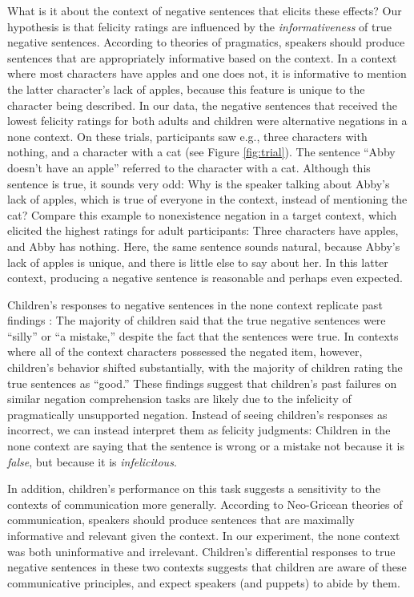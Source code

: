 \documentclass[man, noapacite]{apa2}
\begin{document}
What is it about the context of negative sentences that elicits these effects? Our hypothesis is that felicity ratings are influenced by the \emph{informativeness} of true negative sentences. According to theories of pragmatics, speakers should produce sentences that are appropriately informative based on the context. In a context where most characters have apples and one does not, it is informative to mention the latter character's lack of apples, because this feature is unique to the character being described. In our data, the negative sentences that received the lowest felicity ratings for both adults and children were alternative negations in a none context. On these trials, participants saw e.g., three characters with nothing, and a character with a cat (see Figure \ref{fig:trial}). The sentence ``Abby doesn't have an apple'' referred to the character with a cat. Although this sentence is true, it sounds very odd: Why is the speaker talking about Abby's lack of apples, which is true of everyone in the context, instead of mentioning the cat? Compare this example to nonexistence negation in a target context, which elicited the highest ratings for adult participants: Three characters have apples, and Abby has nothing. Here, the same sentence sounds natural, because Abby's lack of apples is unique, and there is little else to say about her. In this latter context, producing a negative sentence is reasonable and perhaps even expected.

Children's responses to negative sentences in the none context replicate past findings \cite{kim1985}: The majority of children said that the true negative sentences were ``silly'' or ``a mistake,'' despite the fact that the sentences were true. In contexts where all of the context characters possessed the negated item, however, children's behavior shifted substantially, with the majority of children rating the true sentences as ``good.'' These findings suggest that children's past failures on similar negation comprehension tasks are likely due to the infelicity of pragmatically unsupported negation. Instead of seeing children's responses as incorrect, we can instead interpret them as felicity judgments: Children in the none context are saying that the sentence is wrong or a mistake not because it is \emph{false}, but because it is \emph{infelicitous}.

In addition, children's performance on this task suggests a sensitivity to the contexts of communication more generally. According to Neo-Gricean theories of communication, speakers should produce sentences that are maximally informative and relevant given the context. In our experiment, the none context was both uninformative and irrelevant. Children's differential responses to true negative sentences in these two contexts suggests that children are aware of these communicative principles, and expect speakers (and puppets) to abide by them.
\end{document}
